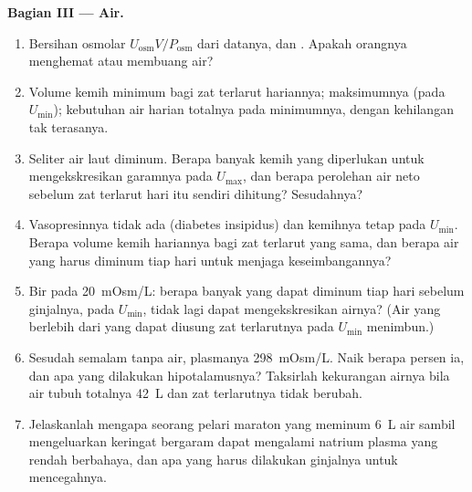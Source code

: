 \begin{problem}
\medskip
\noindent\textbf{Bagian III --- Air.}
\begin{enumerate}[resume]
  \item Bersihan osmolar $U_{\text{osm}}V/P_{\text{osm}}$ dari
        datanya, dan . Apakah orangnya menghemat atau
        membuang air?
  \item Volume kemih minimum bagi zat terlarut hariannya; maksimumnya (pada
        $U_{\min}$); kebutuhan air harian totalnya pada minimumnya, dengan
        kehilangan tak terasanya.
  \item Seliter air laut diminum. Berapa banyak kemih yang diperlukan untuk
        mengekskresikan garamnya pada $U_{\max}$, dan berapa perolehan air neto
        sebelum zat terlarut hari itu sendiri dihitung? Sesudahnya?
  \item Vasopresinnya tidak ada (diabetes insipidus) dan kemihnya tetap
        pada $U_{\min}$. Berapa volume kemih hariannya bagi zat terlarut yang sama, dan berapa
        air yang harus diminum tiap hari untuk menjaga keseimbangannya?
  \item Bir pada \qty{20}{mOsm/L}: berapa banyak yang dapat diminum tiap hari sebelum
        ginjalnya, pada $U_{\min}$, tidak lagi dapat mengekskresikan airnya?
        (Air yang berlebih dari yang dapat diusung zat terlarutnya pada $U_{\min}$
        menimbun.)
  \item Sesudah semalam tanpa air,  plasmanya
        \qty{298}{mOsm/L}. Naik berapa persen ia, dan apa yang dilakukan
        hipotalamusnya? Taksirlah kekurangan airnya bila air tubuh
        totalnya \qty{42}{L} dan zat terlarutnya tidak berubah.
  \item Jelaskanlah mengapa seorang pelari maraton yang meminum \qty{6}{L} air
        sambil mengeluarkan keringat bergaram dapat mengalami natrium plasma yang rendah berbahaya,
        dan apa yang harus dilakukan ginjalnya untuk mencegahnya.
\end{enumerate}


\end{problem}
